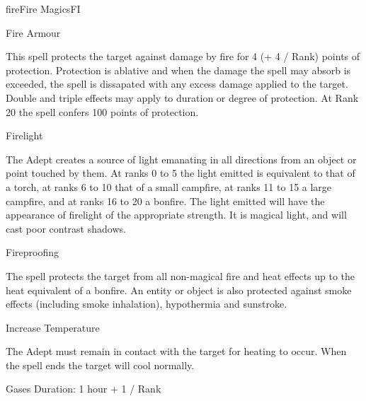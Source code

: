 \begin{college}[2.0]{fire}{Fire Magics}{FI}
\begin{spell}[G-3]{Fire Armour}
\begin{effects}
This spell protects the target against damage by fire for 4 (+ 4 /
Rank) points of protection. Protection is ablative and when the damage
the spell may absorb is exceeded, the spell is dissapated with any
excess damage applied to the target. Double and triple effects may
apply to duration or degree of protection. At Rank 20 the spell
confers 100 points of protection.
\end{effects}
\end{spell}

\begin{spell}[G-4]{Firelight}
\begin{effects}
The Adept creates a source of light emanating in all directions from
an object or point touched by them. At ranks 0 to 5 the light emitted
is equivalent to that of a torch, at ranks 6 to 10 that of a small
campfire, at ranks 11 to 15 a large campfire, and at ranks 16 to 20 a
bonfire. The light emitted will have the appearance of firelight of
the appropriate strength. It is magical light, and will cast poor
contrast shadows.
\end{effects}
\end{spell}

\begin{spell}[G-5]{Fireproofing}
\begin{effects}
The spell protects the target from all non-magical fire and heat
effects up to the heat equivalent of a bonfire. An entity or object is
also protected against smoke effects (including smoke inhalation),
hypothermia and sunstroke.
\end{effects}
\end{spell}

\begin{spell}[G-6]{Increase Temperature}
\begin{effects}
The Adept must remain in contact with the target for heating
to occur.  When the spell ends the target will cool normally.
\begin{Description}
\item[Gases] Duration: 1 hour + 1 / Rank


\end{Description}
\end{effects}
\end{spell}
\end{college}
